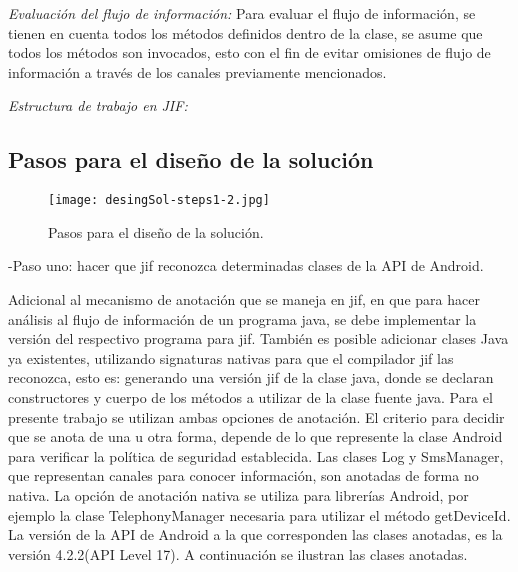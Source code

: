 \textit{Evaluación del flujo de información:}\newline
Para evaluar el flujo de información, se tienen en cuenta todos los métodos
definidos dentro de la clase, se asume que todos los métodos son invocados, esto
con el fin de evitar omisiones de flujo de información a través de los canales
previamente mencionados.

\textit{Estructura de trabajo en JIF:}\newline


\subsection{Pasos para el diseño de la solución}

\begin{figure}[h!]
	\begin{center}
	\texttt{[image: desingSol-steps1-2.jpg]}
	\end{center}
	\caption{Pasos para el diseño de la solución.}
	\label{fig:desingSol-steps1-2}
\end{figure}

-Paso uno: hacer que jif reconozca determinadas clases de la API de
Android.\newline 

Adicional al mecanismo de anotación que se maneja en jif, en que para hacer
análisis al flujo de información de un programa java, se debe implementar la
versión del respectivo programa para jif. También es posible adicionar clases
Java ya existentes, utilizando signaturas nativas para que el compilador jif las
reconozca, esto es: generando una versión jif de la clase java, donde se
declaran constructores y cuerpo de los métodos a utilizar de la clase fuente
java.\newline
Para el presente trabajo se utilizan ambas opciones de anotación. El criterio
para decidir que se anota de una u otra forma, depende de lo que represente la
clase Android para verificar la política de seguridad establecida. Las clases
Log y SmsManager, que representan canales para conocer información, son anotadas
de forma no nativa. La opción de anotación nativa se utiliza para librerías
Android, por ejemplo la clase TelephonyManager necesaria para utilizar el método
getDeviceId.\newline 
La versión de la API de Android a la que corresponden las clases anotadas, es la
versión 4.2.2(API Level 17).\newline 
A continuación se ilustran las clases anotadas.

